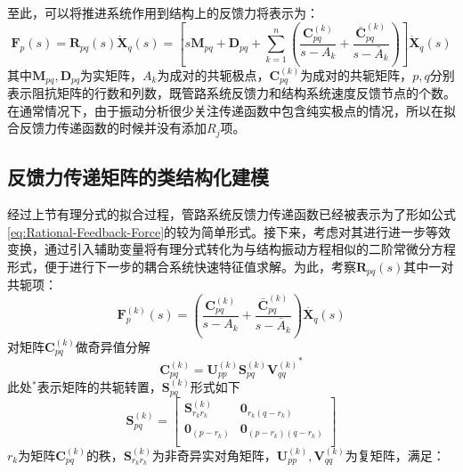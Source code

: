 至此，可以将推进系统作用到结构上的反馈力将表示为：
\begin{equation}
	\label{eq:Rational-Feedback-Force}
	\boldsymbol{F}_p(s)= \boldsymbol{R}_{pq}(s)\boldsymbol{\dot{X}}_q(s)
	=\left[ s\boldsymbol{M}_{pq}+ \boldsymbol{D}_{pq}+ \sum_{k=1}^n
	\left( \frac{\boldsymbol{C}_{pq}^{(k)}}{s-{A}_k} +
	\frac{\bar{\boldsymbol{C}}_{pq}^{(k)}}{s-\bar{A}_k}  \right)
	 \right] \boldsymbol{\dot{X}}_q(s)
\end{equation}
其中$\boldsymbol{M}_{pq}, \boldsymbol{D}_{pq}$为实矩阵，${A}_k$为成对的共轭极点，$\boldsymbol{C}_{pq}^{(k)}$为成对的共轭矩阵，$p,q$分别表示阻抗矩阵的行数和列数，既管路系统反馈力和结构系统速度反馈节点的个数。在通常情况下，由于振动分析很少关注传递函数中包含纯实极点的情况，所以在拟合反馈力传递函数的时候并没有添加$R_j$项。

\subsection{反馈力传递矩阵的类结构化建模}
经过上节有理分式的拟合过程，管路系统反馈力传递函数已经被表示为了形如公式\eqref{eq:Rational-Feedback-Force}的较为简单形式。接下来，考虑对其进行进一步等效变换，通过引入辅助变量将有理分式转化为与结构振动方程相似的二阶常微分方程形式，便于进行下一步的耦合系统快速特征值求解。为此，考察$\boldsymbol{R}_{pq}(s)$其中一对共轭项：
\begin{equation}
	\label{eq:Feedback-Force-Original}
	\boldsymbol{F}_p^{(k)}(s)=\left( \frac{\boldsymbol{C}_{pq}^{(k)}}{s-A_k}+ \frac{\bar{\boldsymbol{C}}_{pq}^{(k)}}{s-\bar{A}_k} \right) \dot{\boldsymbol{X}_q}(s)
\end{equation}
对矩阵$\boldsymbol{C}_{pq}^{(k)}$做奇异值分解\cite{Golub:1996}
\begin{equation}
	\label{eq:QR-Dissect}
	\boldsymbol{C}_{pq}^{(k)}=\boldsymbol{U}_{pp}^{(k)}\boldsymbol{S}_{pq}^{(k)}{\boldsymbol{V}_{qq}^{(k)}}^{*}
\end{equation}
此处${}^*$表示矩阵的共轭转置，$\boldsymbol{S}_{pq}^{(k)}$形式如下
\begin{equation}
	\label{eq:SVD-Rank-Analysis}
	\boldsymbol{S}_{pq}^{(k)}=\left[ \begin{matrix}
	   \boldsymbol{S}_{r_kr_k}^{(k)} & \boldsymbol{0}_{r_k(q-r_k)}  \\
	   \boldsymbol{0}_{(p-r_k)} & \boldsymbol{0}_{(p-r_k)(q-r_k)}  \\
	\end{matrix} \right]
\end{equation}
$r_k$为矩阵$\boldsymbol{C}_{pq}^{(k)}$的秩，$\boldsymbol{S}_{r_kr_k}^{(k)}$为非奇异实对角矩阵，$\boldsymbol{U}_{pp}^{(k)}, \boldsymbol{V}_{qq}^{(k)}$为复矩阵，满足：
